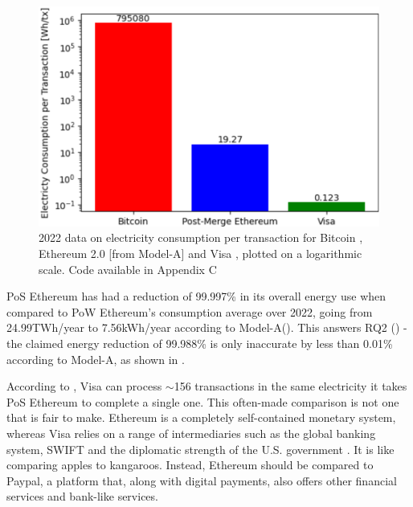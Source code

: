 \begin{figure}[!htb]
    \includegraphics[width=13cm,center]{Figures/ElectricityConsumptionPlot.png}
    \caption{2022 data on electricity consumption per transaction for Bitcoin \cite{BitcoinDigiconomist}, Ethereum 2.0 [from Model-A] and Visa \cite{2022VisaReport}, \cite{VisaHome} plotted on a logarithmic scale. Code available in Appendix C}
    \label{Figure:ElectricityConsumptionPlot}
\end{figure}

PoS Ethereum has had a reduction of 99.997\% in its overall energy use when compared to PoW Ethereum's consumption average over 2022, going from 24.99TWh/year to 7.56kWh/year according to Model-A(\cite{CCRIIndices}). This answers RQ2 () - the claimed energy reduction of 99.988\% is only inaccurate by less than 0.01\% according to Model-A, as shown in .

According to , Visa can process 
$\sim$156 transactions in the same electricity it takes PoS Ethereum to complete a single one. This often-made comparison is not one that is fair to make. Ethereum is a completely self-contained monetary system, whereas Visa relies on a range of intermediaries such as the global banking system, SWIFT and the diplomatic strength of the U.S. government \cite{Carter2021BitcoinComparison}. It is like comparing apples to kangaroos. Instead, Ethereum should be compared to Paypal, a platform that, along with digital payments, also offers other financial services and bank-like services.  

